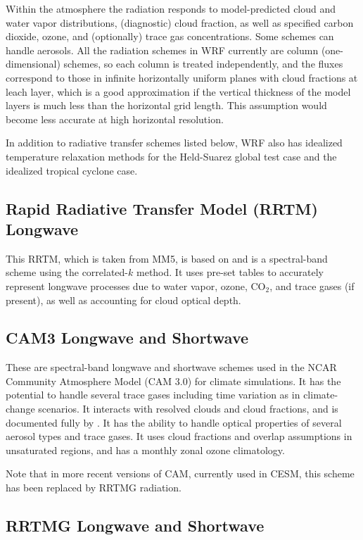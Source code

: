 Within the atmosphere the radiation responds to model-predicted 
cloud and water vapor distributions, (diagnostic) cloud fraction, as well as specified carbon dioxide, 
ozone, and (optionally) trace gas concentrations. Some schemes can handle aerosols. All the radiation schemes 
in WRF currently are column (one-dimensional) schemes, so each column is 
treated independently, and the fluxes correspond to those in 
infinite horizontally uniform  planes with cloud fractions at leach layer, which
is a good approximation if the vertical thickness of the model layers is much 
less than the horizontal grid length. This assumption would become less 
accurate at high horizontal resolution.

In addition to radiative transfer schemes listed below, WRF also has idealized
temperature relaxation methods for the Held-Suarez global test case and the
idealized tropical cyclone case.

\subsection{Rapid Radiative Transfer Model (RRTM) Longwave}

This RRTM, which is taken from MM5, is based on \citet{mlawer97} 
and is a spectral-band scheme using the correlated-$k$ method. 
It uses pre-set tables to accurately represent longwave processes due 
to water vapor, ozone, CO$_2$, and trace gases (if present), as well as 
accounting for cloud optical depth.

\subsection {CAM3 Longwave and Shortwave}

These are spectral-band longwave and shortwave schemes used in the NCAR Community Atmosphere
Model (CAM 3.0) for climate simulations. It has the potential to handle
several trace gases including time variation as in climate-change scenarios. 
It interacts with resolved clouds and cloud fractions,
 and is documented fully by \citet{collins04}.  It has the ability to handle optical properties of
several aerosol types and trace gases. It uses cloud fractions and overlap assumptions
in unsaturated regions, and has a monthly zonal ozone climatology.
 
 Note that in more recent versions of CAM, currently used in CESM, this scheme has been replaced 
 by RRTMG radiation.
 
\subsection {RRTMG Longwave and Shortwave}

